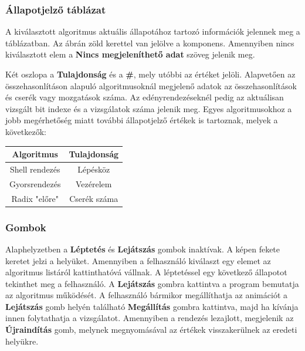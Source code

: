 \documentclass{elteikthesis}
\begin{document}
\subsubsection{Állapotjelző táblázat}
A kiválasztott algoritmus aktuális állapotához tartozó információk jelennek meg a táblázatban. Az ábrán zöld kerettel van jelölve a komponens. Amennyiben nincs kiválasztott elem a \textbf{Nincs megjeleníthető adat} szöveg jelenik meg.\par
Két oszlopa a \textbf{Tulajdonság} és a \textbf{\#}, mely utóbbi az értéket jelöli. Alapvetően az összehasonlításon alapuló algoritmusoknál megjelenő adatok az összehasonlítások és cserék vagy mozgatások száma. Az edényrendezéseknél pedig az aktuálisan vizsgált bit indexe és a vizsgálatok száma jelenik meg. Egyes algoritmusokhoz a jobb megérhetőség miatt további állapotjelző értékek is tartoznak, melyek a következők:
\begin{table}[h]
	\centering
	\begin{tabular}{|c|c|}
		\hline
		\textbf{Algoritmus} & \textbf{Tulajdonság} \\ \hline
		Shell rendezés      & Lépésköz             \\ \hline
		Gyorsrendezés       & Vezérelem            \\ \hline
		Radix "előre"       & Cserék száma         \\ \hline
	\end{tabular}
\end{table}
\subsubsection{Gombok}
Alaphelyzetben a \textbf{Léptetés} és \textbf{Lejátszás} gombok inaktívak. A képen fekete keretet jelzi a helyüket. Amennyiben a felhasználó kiválaszt egy elemet az algoritmus listáról kattinthatóvá vállnak. A léptetéssel egy következő állapotot tekinthet meg a felhasználó. A \textbf{Lejátszás} gombra kattintva a program bemutatja az algoritmus működését. A felhasználó bármikor megállíthatja az animációt a \textbf{Lejátszás} gomb helyén található \textbf{Megállítás} gombra kattintva, majd ha kívánja innen folytathatja a vizsgálatot. Amennyiben a rendezés lezajlott, megjelenik az \textbf{Újraindítás} gomb, melynek megnyomásával az értékek visszakerülnek az eredeti helyükre.
\end{document}
